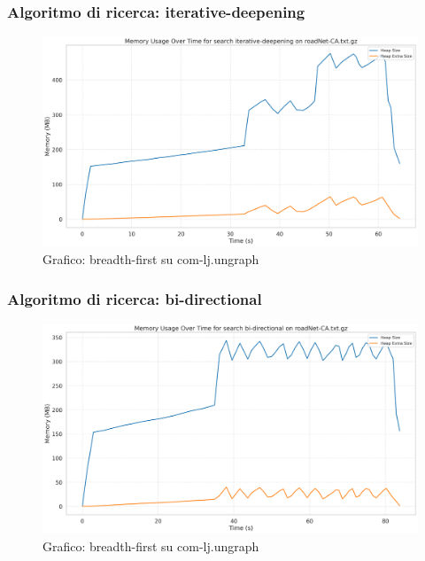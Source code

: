 \documentclass{article}
\begin{document}
\subsubsection{Algoritmo di ricerca: iterative-deepening}
\begin{figure}[h]\centering
\includegraphics[width=\textwidth]{../plots/roadNet-CA_iterative-deepening.png}
\caption{Grafico: breadth-first su com-lj.ungraph}
\end{figure}
\subsubsection{Algoritmo di ricerca: bi-directional}
\begin{figure}[h]\centering
\includegraphics[width=\textwidth]{../plots/roadNet-CA_bi-directional.png}
\caption{Grafico: breadth-first su com-lj.ungraph}
\end{figure}
\end{document}
